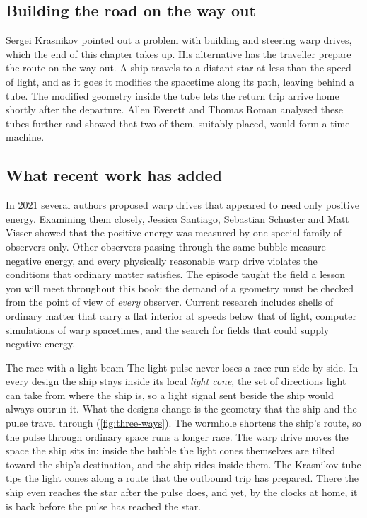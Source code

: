 \subsection{Building the road on the way out}

Sergei Krasnikov pointed out a problem with building and steering warp
drives, which the end of this chapter takes up. His alternative has the
traveller prepare the route on the way out. A ship travels to a distant star at less than the speed of light, and as
it goes it modifies the spacetime along its path, leaving behind a tube. The
modified geometry inside the tube lets the return trip arrive home shortly
after the departure. Allen Everett and Thomas Roman analysed these tubes
further and showed that two of them, suitably placed, would form a time
machine.

\subsection{What recent work has added}

In 2021 several authors proposed warp drives that appeared to need only
positive energy. Examining them closely, Jessica Santiago, Sebastian Schuster
and Matt Visser showed that the positive energy was measured by one special
family of observers only. Other observers passing through the same bubble
measure negative energy, and every physically reasonable warp drive violates
the conditions that ordinary matter satisfies. The episode taught the field a
lesson you will meet throughout this book: the demand of a geometry must be
checked from the point of view of \emph{every} observer. Current research
includes shells of ordinary matter that carry a flat interior at speeds below
that of light, computer simulations of warp spacetimes, and the search for
fields that could supply negative energy.

\begin{revisited}{The race with a light beam}
The light pulse never loses a race run side by side. In every design the ship
stays inside its local \emph{light cone}, the set of directions light can take
from where the ship is, so a light signal sent beside the ship would always
outrun it. What the designs change is the geometry that the ship and the pulse
travel through (\cref{fig:three-ways}). The wormhole shortens the ship's
route, so the pulse through ordinary space runs a longer race. The warp drive
moves the space the ship sits in: inside the bubble the light cones themselves
are tilted toward the ship's destination, and the ship rides inside them. The
Krasnikov tube tips the light cones along a route that the outbound trip has
prepared. There the ship even reaches the star after the pulse does, and yet,
by the clocks at home, it is back before the pulse has reached the star.
\end{revisited}

